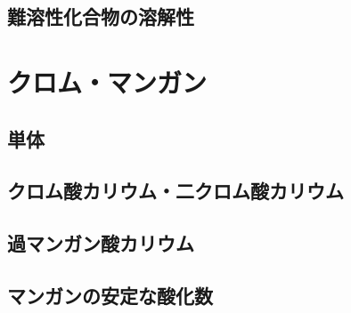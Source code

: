  \subsection{難溶性化合物の溶解性}
 \section{クロム・マンガン}
 \subsection{単体}
 \subsection{クロム酸カリウム・二クロム酸カリウム}
 \subsection{過マンガン酸カリウム}
 \subsection{マンガンの安定な酸化数}
